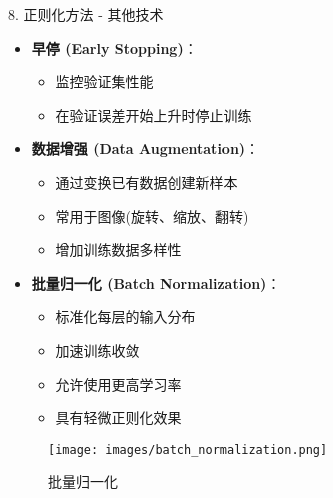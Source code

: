 \documentclass[
  ignorenonframetext,
  aspectratio=169,
  chinese-hans,
]{beamer}
\providecommand{\tightlist}{%
  \setlength{\itemsep}{0pt}\setlength{\parskip}{0pt}}\usepackage{longtable,booktabs,array}
\begin{document}
\begin{frame}{8. 正则化方法 - 其他技术}
\label{ux6b63ux5219ux5316ux65b9ux6cd5---ux5176ux4ed6ux6280ux672f}
\begin{itemize}
\tightlist
\item
  \textbf{早停 (Early Stopping)}：

  \begin{itemize}
  \tightlist
  \item
    监控验证集性能
  \item
    在验证误差开始上升时停止训练
  \end{itemize}
\item
  \textbf{数据增强 (Data Augmentation)}：

  \begin{itemize}
  \tightlist
  \item
    通过变换已有数据创建新样本
  \item
    常用于图像(旋转、缩放、翻转)
  \item
    增加训练数据多样性
  \end{itemize}
\item
  \textbf{批量归一化 (Batch Normalization)}：

  \begin{itemize}
  \tightlist
  \item
    标准化每层的输入分布
  \item
    加速训练收敛
  \item
    允许使用更高学习率
  \item
    具有轻微正则化效果
  \end{itemize}
\end{itemize}

\begin{figure}[H]

{\centering \texttt{[image: images/batch\_normalization.png]}

}

\caption{批量归一化}

\end{figure}%
\end{frame}
\end{document}
